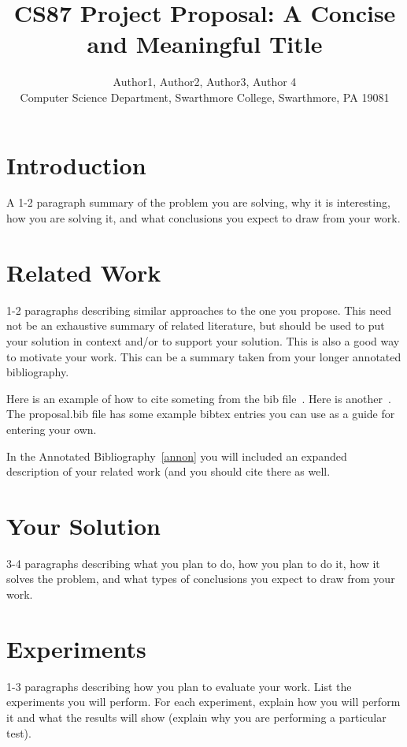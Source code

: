 \documentclass[11pt]{article}
\begin{document}

\title{CS87 Project Proposal: A Concise and Meaningful Title}

\author{Author1, Author2, Author3, Author 4 \\ 
Computer Science Department, Swarthmore College, Swarthmore, PA  19081}

\maketitle

\section {Introduction}\label{intro} 
A 1-2 paragraph summary of the problem you are solving, why it is interesting,
how you are solving it, and what conclusions 
you expect to draw from your work.

\section {Related Work}\label{rel}
1-2 paragraphs describing similar approaches to the one you propose. This need
not be an exhaustive summary of related literature, but should be used to put
your solution in context and/or to support your solution. This is also a good
way to motivate your work. This can be a summary taken from your longer
annotated bibliography.  

Here is an example of how to cite someting from the bib 
file~\cite{newhall:nswap2L}.  Here is another~\cite{unixV}.  
The proposal.bib file has some example 
bibtex entries you can use as a guide for entering your own.

In the Annotated Bibliography~\ref{annon} you will included an expanded description of your related work (and you should cite there as well.

\section {Your Solution}\label{soln}
3-4 paragraphs describing what you plan to do, how you plan to do it, how it
solves the problem, and what types of conclusions you expect to draw from your
work.

\section {Experiments}\label{exper}
1-3 paragraphs describing how you plan to evaluate your work. List the
experiments you will perform. For each experiment, explain how you will perform
it and what the results will show (explain why you are performing a particular
test).
\end{document}
